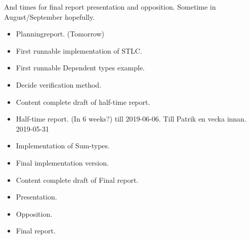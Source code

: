 \documentclass[parskip=half]{scrartcl}
\begin{document}
And times for final report presentation and opposition.
Sometime in August/September hopefully.

\begin{itemize}
  \item Planningreport. (Tomorrow)
  \item First runnable implementation of STLC.
  \item First runnable Dependent types example.
  \item Decide verification method.
  \item Content complete draft of half-time report.
  \item Half-time report. (In 6 weeks?) till 2019-06-06. Till Patrik en vecka
    innan. 2019-05-31
  \item Implementation of Sum-types.
  \item Final implementation version.
  \item Content complete draft of Final report.
  \item Presentation.
  \item Opposition.
  \item Final report.
\end{itemize}





\end{document}
